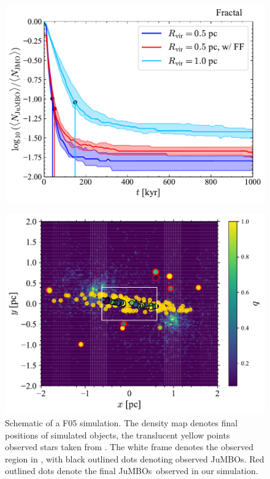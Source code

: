 \documentclass[aa]{lib/aa}
\newcommand{\jumbos}{\mbox{JuMBOs}}
\begin{document}
   \begin{figure}
    \centering
        \includegraphics[width=\columnwidth]{figures/Fractal_General__fJuMBO_evol.pdf    }
        \caption{}
         \label{Fig:Fjumbo_vs_time_model_ISF_R05}
   \end{figure}
   
   \begin{figure}
    \centering
        \includegraphics[width=\columnwidth]{figures/overplotting_HEATMAP.pdf}
        \caption{Schematic of a F05 simulation. The density map denotes final positions of simulated objects, the translucent yellow points observed stars taken from \citet{2016A&A...595A...1G, 2023A&A...674A...1G}. The white frame denotes the observed region in \citet{2023arXiv231001231P}, with black outlined dots denoting observed JuMBOs. Red outlined dots denote the final \jumbos\, observed in our simulation.}
         \label{Fig:Overplot}
   \end{figure}
\end{document}
